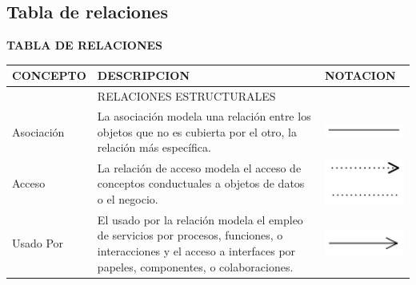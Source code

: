 \subsection{Tabla de relaciones}

\begin{table}[H]
	\centering\textbf{TABLA DE RELACIONES}
	\centering
	\begin{tabular}{| m{4cm} | m{4cm} | m{4cm} | }
		\hline
		\centering\vspace{1.52mm}CONCEPTO & \centering\vspace{1.52mm}DESCRIPCION &\vspace{1.52mm}NOTACION \\
		\hline
		&\centering\vspace{1.52mm}RELACIONES ESTRUCTURALES & \\
		\hline
		\centering\vspace{1.52mm}Asociación & \vspace{1.52mm}La asociación modela una relación entre los objetos que no es cubierta por el otro, la relación más específica.& \vspace{1.52mm}\includegraphics[width=40mm]{arquitectura/imagenes/41} \\
		\hline
		\centering\vspace{1.52mm}Acceso & \vspace{1.52mm}La relación de acceso modela el acceso de conceptos conductuales a objetos de datos o el negocio.& \vspace{1.52mm}\includegraphics[width=40mm]{arquitectura/imagenes/42} \\
		\hline
		\centering\vspace{1.52mm}Usado Por & \vspace{1.52mm}El usado por la relación modela el empleo de servicios por procesos, funciones, o interacciones y el acceso a interfaces por papeles, componentes, o colaboraciones.& \vspace{1.52mm}\includegraphics[width=30mm]{arquitectura/imagenes/43} \\
		\hline
	\end{tabular}
\end{table}

